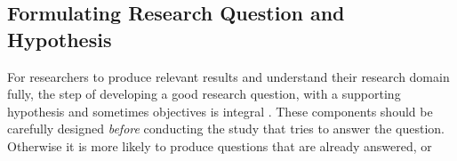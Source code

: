 \subsection{Formulating Research Question and Hypothesis}
\label{subsec:formulating research question and hypothesis}

For researchers to produce relevant results and understand their research domain fully, the step of developing a good research question, with a supporting hypothesis and sometimes objectives is integral \cite{Farrugia2009}. These components should be carefully designed \emph{before} conducting the study that tries to answer the question. Otherwise it is more likely to produce questions that are already answered, or  \cite[p. 280]{Farrugia2009} 
